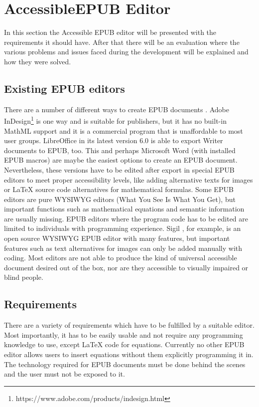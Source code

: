 \chapter{AccessibleEPUB Editor}
\label{ch:AccessibleEPUB Editor}

In this section the Accessible EPUB editor will be presented with the requirements it should have. After that there will be an evaluation where the various problems and issues faced during the development will be explained and how they were solved.

\section{Existing EPUB editors}
\label{ch:exEPUB}
There are a number of different ways to create EPUB documents \cite{EPUBprograms}. Adobe InDesign\footnote{https://www.adobe.com/products/indesign.html} is one way and is suitable for publishers, but it has no built-in MathML support and it is a commercial program that is unaffordable to most user groups. LibreOffice in its latest version 6.0 is able to export Writer documents to EPUB, too. This and perhaps Microsoft Word (with installed EPUB macros) are maybe the easiest options to create an EPUB document. Nevertheless, these versions have to be edited after export in special EPUB editors to meet proper accessibility levels, like adding alternative texts for images or LaTeX source code alternatives for mathematical formulas.
Some EPUB editors are pure WYSIWYG editors (What You See Is What You Get), but important functions such as mathematical equations and semantic information are usually missing. EPUB editors where the program code has to be edited are limited to individuals with programming experience. Sigil \cite{Sigil}, for example, is an open source WYSIWYG EPUB editor with many features, but important features such as text alternatives for images can only be added manually with coding.
Most editors are not able to produce the kind of universal accessible document desired out of the box, nor are they accessible to visually impaired or blind people. 

\section{Requirements}

There are a variety of requirements which have to be fulfilled by a suitable editor. Most importantly, it has to be easily usable and not require any programming knowledge to use, except LaTeX code for equations. Currently no other EPUB editor allows users to insert equations without them explicitly programming it in. The technology required for EPUB documents must be done behind the scenes and the user must not be exposed to it. 

